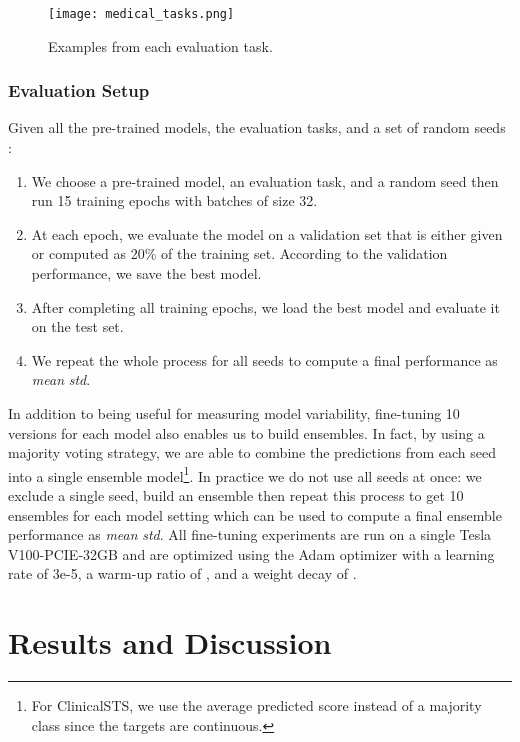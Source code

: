 \documentclass[11pt]{article}
\begin{document}
\begin{figure}[htbp]
\begin{center} 
\texttt{[image: medical\_tasks.png]}
\end{center} 
\caption{Examples from each evaluation task.} \label{medical_tasks}
\end{figure}

\subsubsection{Evaluation Setup}

Given all the pre-trained models, the evaluation tasks, and a set of random seeds :
\begin{enumerate}
    \item We choose a pre-trained model, an evaluation task, and a random seed  then run 15 training epochs with batches of size 32. \item At each epoch, we evaluate the model on a validation set that is either given or computed as 20\% of the training set. According to the validation performance, we save the best model. \item After completing all training epochs, we load the best model and evaluate it on the test set. \item We repeat the whole process for all seeds to compute a final performance as \textit{mean}  \textit{std}.
\end{enumerate}

In addition to being useful for measuring model variability, fine-tuning 10 versions for each model also enables us to build ensembles. In fact, by using a majority voting strategy, we are able to combine the predictions from each seed into a single ensemble model\footnote{For ClinicalSTS, we use the average predicted score instead of a majority class since the targets are continuous.}. In practice we do not use all seeds at once: we exclude a single seed, build an ensemble then repeat this process to get 10 ensembles for each model setting which can be used to compute a final ensemble performance as \textit{mean}  \textit{std}. All fine-tuning experiments are run on a single Tesla\,V100-PCIE-32GB and are optimized using the Adam optimizer \cite{kingma2014adam} with a learning rate of 3e-5, a warm-up ratio of , and a weight decay of .

\section{Results and Discussion}
\end{document}
